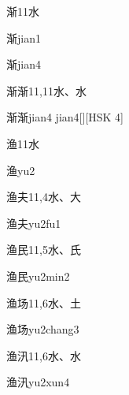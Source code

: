 \begin{entry}{渐}{11}{⽔}
  \begin{phonetics}{渐}{jian1}
  \end{phonetics}
  \begin{phonetics}{渐}{jian4}
  \end{phonetics}
\end{entry}

\begin{entry}{渐渐}{11,11}{⽔、⽔}
  \begin{phonetics}{渐渐}{jian4 jian4}[][HSK 4]
  \end{phonetics}
\end{entry}

\begin{entry}{渔}{11}{⽔}
  \begin{phonetics}{渔}{yu2}
  \end{phonetics}
\end{entry}

\begin{entry}{渔夫}{11,4}{⽔、⼤}
  \begin{phonetics}{渔夫}{yu2fu1}
  \end{phonetics}
\end{entry}

\begin{entry}{渔民}{11,5}{⽔、⽒}
  \begin{phonetics}{渔民}{yu2min2}
  \end{phonetics}
\end{entry}

\begin{entry}{渔场}{11,6}{⽔、⼟}
  \begin{phonetics}{渔场}{yu2chang3}
  \end{phonetics}
\end{entry}

\begin{entry}{渔汛}{11,6}{⽔、⽔}
  \begin{phonetics}{渔汛}{yu2xun4}
  \end{phonetics}
\end{entry}

